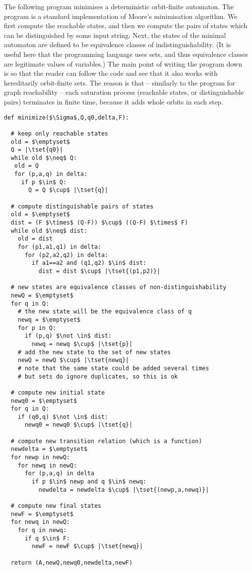 \begin{myexample} \label{ex:moore-algorithm}The following program minimises a deterministic orbit-finite automaton. The program is a  standard implementation of Moore's minimisation algorithm. We first compute the reachable states, and then we compute the pairs of states which can be distinguished by some input string. Next, the states of the minimal automaton are defined to be equivalence classes of indistinguishability. (It is useful here that the programming language uses sets, and thus equivalence classes are legitimate values of variables.) 
	 The main point of writing the program down  is so that the reader can 
	follow the code and see that it also works with hereditarily orbit-finite sets. The reason is that -- similarly to the program for  graph reachability -- each saturation process (reachable states, or distinguishable pairs) terminates in finite time, because it adds whole orbits in each step. 

\begin{lstlisting}
def minimize($\Sigma$,Q,q0,delta,F):

  # keep only reachable states
  old = $\emptyset$
  Q = |\tset{q0}|
  while old $\neq$ Q: 
   old = Q
   for (p,a,q) in delta:
	 if p $\in$ Q: 
	   Q = Q $\cup$ |\tset{q}|
	 
  # compute distinguishable pairs of states
  old = $\emptyset$
  dist = (F $\times$ (Q-F)) $\cup$ ((Q-F) $\times$ F)
  while old $\neq$ dist: 
	old = dist
    for (p1,a1,q1) in delta:
	  for (p2,a2,q2) in delta:
	    if a1==a2 and (q1,q2) $\in$ dist:
		  dist = dist $\cup$ |\tset{(p1,p2)}|

  # new states are equivalence classes of non-distinguishability
  newQ = $\emptyset$
  for q in Q:
	# the new state will be the equivalence class of q
    newq = $\emptyset$
	for p in Q: 
	  if (p,q) $\not \in$ dist:
	  	newq = newq $\cup$ |\tset{p}|
	# add the new state to the set of new states
	newQ = newQ $\cup$ |\tset{newq}|
    # note that the same state could be added several times
	# but sets do ignore duplicates, so this is ok

  # compute new initial state
  newq0 = $\emptyset$
  for q in Q:
    if (q0,q) $\not \in$ dist:
	  newq0 = newq0 $\cup$ |\tset{q}|

  # compute new transition relation (which is a function)
  newdelta = $\emptyset$
  for newp in newQ:
	for newq in newQ:
	  for (p,a,q) in delta 
		if p $\in$ newp and q $\in$ newq:
		  newdelta = newdelta $\cup$ |\tset{(newp,a,newq)}|

  # compute new final states
  newF = $\emptyset$
  for newq in newQ:
	for q in newq:
	  if q $\in$ F:
		newF = newF $\cup$ |\tset{newq}|

  return (A,newQ,newq0,newdelta,newF)
\end{lstlisting}
\end{myexample}

